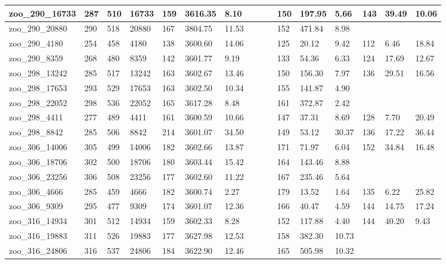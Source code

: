 \begin{landscape}
\begin{longtable}{llllllllllllllll}
zoo\_290\_16733 & 287 & 510 & 16733 & 159 & 3616.35 & 8.10 &  &  &  & 150 & 197.95 & 5.66 & 143 & 39.49 & 10.06 \\ \hline 
zoo\_290\_20880 & 290 & 518 & 20880 & 167 & 3804.75 & 11.53 &  &  &  & 152 & 471.84 & 8.98 &  &  &  \\ \hline 
zoo\_290\_4180 & 254 & 458 & 4180 & 138 & 3600.60 & 14.06 &  &  &  & 125 & 20.12 & 9.42 & 112 & 6.46 & 18.84 \\ \hline 
zoo\_290\_8359 & 268 & 480 & 8359 & 142 & 3601.77 & 9.19 &  &  &  & 133 & 54.36 & 6.33 & 124 & 17.69 & 12.67 \\ \hline 
zoo\_298\_13242 & 285 & 517 & 13242 & 163 & 3602.67 & 13.46 &  &  &  & 150 & 156.30 & 7.97 & 136 & 29.51 & 16.56 \\ \hline 
zoo\_298\_17653 & 293 & 529 & 17653 & 163 & 3602.50 & 10.34 &  &  &  & 155 & 141.87 & 4.90 &  &  &  \\ \hline 
zoo\_298\_22052 & 298 & 536 & 22052 & 165 & 3617.28 & 8.48 &  &  &  & 161 & 372.87 & 2.42 &  &  &  \\ \hline 
zoo\_298\_4411 & 277 & 489 & 4411 & 161 & 3600.59 & 10.66 &  &  &  & 147 & 37.31 & 8.69 & 128 & 7.70 & 20.49 \\ \hline 
zoo\_298\_8842 & 285 & 506 & 8842 & 214 & 3601.07 & 34.50 &  &  &  & 149 & 53.12 & 30.37 & 136 & 17.22 & 36.44 \\ \hline 
zoo\_306\_14006 & 305 & 499 & 14006 & 182 & 3602.66 & 13.87 &  &  &  & 171 & 71.97 & 6.04 & 152 & 34.84 & 16.48 \\ \hline 
zoo\_306\_18706 & 302 & 500 & 18706 & 180 & 3603.44 & 15.42 &  &  &  & 164 & 143.46 & 8.88 &  &  &  \\ \hline 
zoo\_306\_23256 & 306 & 508 & 23256 & 177 & 3602.60 & 11.22 &  &  &  & 167 & 235.46 & 5.64 &  &  &  \\ \hline 
zoo\_306\_4666 & 285 & 459 & 4666 & 182 & 3600.74 & 2.27 &  &  &  & 179 & 13.52 & 1.64 & 135 & 6.22 & 25.82 \\ \hline 
zoo\_306\_9309 & 295 & 477 & 9309 & 174 & 3601.07 & 12.36 &  &  &  & 166 & 40.47 & 4.59 & 144 & 14.75 & 17.24 \\ \hline 
zoo\_316\_14934 & 301 & 512 & 14934 & 159 & 3602.33 & 8.28 &  &  &  & 152 & 117.88 & 4.40 & 144 & 40.20 & 9.43 \\ \hline 
zoo\_316\_19883 & 311 & 526 & 19883 & 177 & 3627.98 & 12.53 &  &  &  & 158 & 382.30 & 10.73 &  &  &  \\ \hline 
zoo\_316\_24806 & 316 & 537 & 24806 & 184 & 3622.90 & 12.46 &  &  &  & 165 & 505.98 & 10.32 &  &  &  \\ \hline 

\end{longtable}
\end{landscape}
